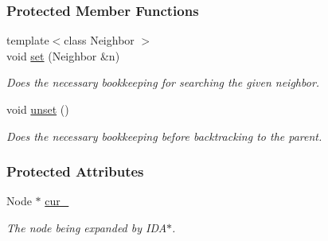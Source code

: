\subsubsection*{Protected Member Functions}
\begin{DoxyCompactItemize}
\item 
{\footnotesize template$<$class Neighbor $>$ }\\void \hyperlink{structslb_1_1ext_1_1policy_1_1backtrackLock_1_1InplaceBase_a9f838f14f1b87a7c96e3475e586c93d3}{set} (Neighbor \&n)
\begin{DoxyCompactList}\small\item\em Does the necessary bookkeeping for searching the given neighbor. \end{DoxyCompactList}\item 
void \hyperlink{structslb_1_1ext_1_1policy_1_1backtrackLock_1_1InplaceBase_a5ac11057420d465ee33087c504c026e0}{unset} ()\hypertarget{structslb_1_1ext_1_1policy_1_1backtrackLock_1_1InplaceBase_a5ac11057420d465ee33087c504c026e0}{}\label{structslb_1_1ext_1_1policy_1_1backtrackLock_1_1InplaceBase_a5ac11057420d465ee33087c504c026e0}

\begin{DoxyCompactList}\small\item\em Does the necessary bookkeeping before backtracking to the parent. \end{DoxyCompactList}\end{DoxyCompactItemize}
\subsubsection*{Protected Attributes}
\begin{DoxyCompactItemize}
\item 
Node $\ast$ \hyperlink{structslb_1_1ext_1_1policy_1_1backtrackLock_1_1InplaceBase_a3e9e83ff286e8f93a4ff2d52678d4d7e}{cur\+\_\+}\hypertarget{structslb_1_1ext_1_1policy_1_1backtrackLock_1_1InplaceBase_a3e9e83ff286e8f93a4ff2d52678d4d7e}{}\label{structslb_1_1ext_1_1policy_1_1backtrackLock_1_1InplaceBase_a3e9e83ff286e8f93a4ff2d52678d4d7e}

\begin{DoxyCompactList}\small\item\em The node being expanded by I\+D\+A$\ast$. \end{DoxyCompactList}\end{DoxyCompactItemize}
